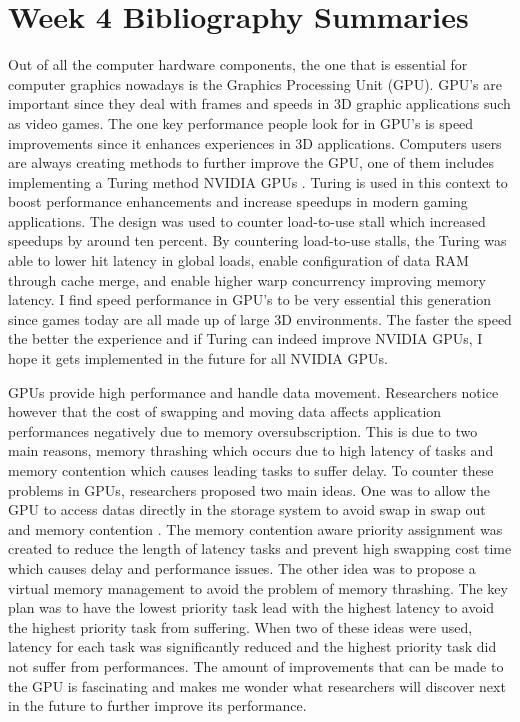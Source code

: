 \documentclass{article}
\begin{document}
\section{Week 4 Bibliography Summaries}

Out of all the computer hardware components, the one that is essential for computer graphics nowadays is the Graphics Processing Unit (GPU). GPU’s are important since they deal with frames and speeds in 3D graphic applications such as video games. The one key performance people look for in GPU’s is speed improvements since it enhances experiences in 3D applications. Computers users are always creating methods to further improve the GPU, one of them includes implementing a Turing method NVIDIA GPUs \cite{9151311}. Turing is used in this context to  boost performance enhancements and increase speedups in modern gaming applications. The design was used to counter load-to-use stall which increased speedups by around ten percent. By countering load-to-use stalls, the Turing was able to lower hit latency in global loads, enable configuration of data RAM through cache merge, and enable higher warp concurrency improving memory latency. I find speed performance in GPU’s to be very essential this generation since games today are all made up of large 3D environments. The faster the speed the better the experience and if Turing can indeed improve NVIDIA GPUs, I hope it gets implemented in the future for all NVIDIA GPUs.

GPUs provide high performance and handle data movement. Researchers notice however that the cost of swapping and moving data affects application performances negatively due to memory oversubscription. This is due to two main reasons, memory thrashing which occurs due to high latency of tasks and memory contention which causes leading tasks to suffer delay. To counter these problems in GPUs, researchers proposed two main ideas. One was to allow the GPU to access datas directly in the storage system to avoid swap in swap out and memory contention \cite{10.1145/3341105.3373866}. The memory contention aware priority assignment was created to reduce the length of latency tasks and prevent high swapping cost time which causes delay and performance issues. The other idea was to propose a virtual memory management to avoid the problem of memory thrashing. The key plan was to have the lowest priority task lead with the highest latency to avoid the highest priority task from suffering. When two of these ideas were used, latency for each task was significantly reduced and the highest priority task did not suffer from performances. The amount of improvements that can be made to the GPU is fascinating and makes me wonder what researchers will discover next in the future to further improve its performance. 
\end{document}
